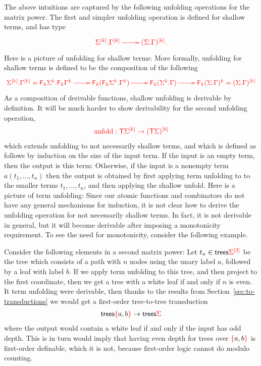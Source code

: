 The above intuitions are captured by the following unfolding operations for the matrix power. The first and simpler unfolding operation is defined for shallow terms, and has type
\begin{align*}
    \ranked{
        \xymatrix{
            \shallowterm{\mati k \rSigma} {\mati k \rGamma}  \ar[r] & \mati k {(\shallowterm \Sigma \Gamma)}.
        }
    }
\end{align*}
Here is a picture of unfolding for shallow terms:
More formally, unfolding for shallow terms is defined to be   the composition of the following
\begin{align*}
\ranked{
    \xymatrix{
        \shallowterm{\mati k \rSigma} {\mati k \rGamma} = {\shallowterm{\reduce k {\Sigma^k}}{\reduce k {\Gamma^k}}} \ar[r] &
        \reduce k(\shallowterm{\reduce k {\Sigma^k}}{ {\Gamma^k}}) \ar[r] &
        \reduce k(\shallowterm{\Sigma^k}{ {\Gamma}}) \ar[r] &
        \reduce k(\shallowterm{\Sigma}{ {\Gamma}})^k = \mati k {(\shallowterm \Sigma \Gamma)}
    }
}
\end{align*}
As a composition of derivable functions, shallow unfolding is derivable by definition.  It will be much harder to show derivability for the second unfolding operation, 
\begin{align*}
    \ranked{\unfold : \tmonad \mati k \rSigma \to \mati k {(\tmonad \Sigma)} }
    \end{align*}
    which extends unfolding to  not necessarily shallow terms, and which is
defined as follows by induction on the size of the input term. If the input is an empty term, then the output is this term:
Otherwise, if the input is a nonempty term $a(t_1,\ldots,t_n)$ then the output is obtained by first applying term unfolding to to the smaller terms $t_1,\ldots,t_n$, and then applying the shallow unfold. Here is a picture of term unfolding: 
Since our atomic functions and combinators do not have any general mechanisms for induction, it is not clear how to derive the unfolding operation for not necessarily shallow terms. In fact, it is not derivable in general, but it will become derivable after imposing a monotonicity requirement.   To see the need for monotonicity, consider the following example.
\begin{example}\label{eq:twist}
    Consider the following elements in a second matrix power:
Let $t_n \in \trees \mati 2 \rSigma$ be the tree which consists of a path with $n$ nodes using the unary label $a$, followed by a leaf with label $b$. If we apply term unfolding to this tree, and then project to the first coordinate, then we get a tree with a white leaf if and only if  $n$ is even.  It term   unfolding were derivable, then thanks to the results from Section~\ref{sec:to-transductions}  we would get a first-order tree-to-tree transduction 
\begin{align*}
\trees \redset{a,b} \to \trees \rSigma
\end{align*}
where the output would contain a white leaf if and only if the input has odd depth. This is in turn would imply that having even depth for trees over $\redset{a,b}$ is first-order definable, which it is not, because first-order logic cannot do modulo counting.
\end{example}

